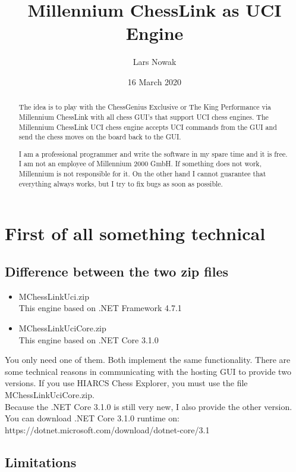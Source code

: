 \documentclass[11pt,a4paper]{article}
\title{Millennium ChessLink as UCI Engine}
\author{Lars Nowak}
\date{16 March 2020}
\begin{document}
\maketitle

\begin{abstract}
The idea is to play with the ChessGenius Exclusive or The King Performance via Millennium ChessLink with all chess GUI’s that support UCI chess engines. The Millennium ChessLink UCI chess engine accepts UCI commands from the GUI and send the chess moves on the board back to the GUI.

I am a professional programmer and write the software in my spare time and it is free. I am not an employee of Millennium 2000 GmbH. If something does not work, Millennium is not responsible for it. On the other hand I cannot guarantee that everything always works, but I try to fix bugs as soon as possible.
\end{abstract}

\newpage
\tableofcontents
\newpage

\section{First of all something technical}

\subsection{Difference between the two zip files}
\begin{itemize}
\item MChessLinkUci.zip\\
This engine based on .NET Framework 4.7.1
\item MChessLinkUciCore.zip\\
This engine based on .NET Core 3.1.0
\end{itemize}
You only need one of them. Both implement the same functionality.
There are some technical reasons in communicating with the hosting GUI to provide two versions. 
If you use HIARCS Chess Explorer, you must use the file MChessLinkUciCore.zip.\\
Because the .NET Core 3.1.0 is still very new, I also provide the other version. You can download .NET Core 3.1.0 runtime on:\\ https://dotnet.microsoft.com/download/dotnet-core/3.1

\subsection{Limitations}
\end{document}
